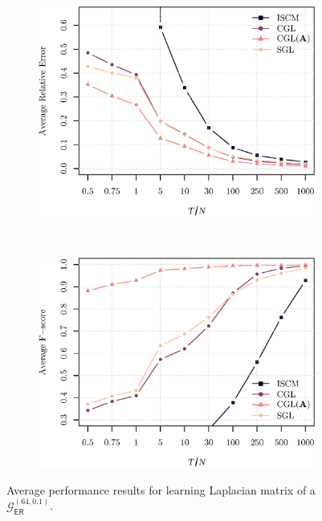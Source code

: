 \begin{figure}[!htb]
    \centering
    \begin{subfigure}[b]{0.47\textwidth}
        \includegraphics[width=\textwidth]{erdos-renyi/relative_error_erdos_renyi.eps}
    \end{subfigure}
    ~ %
    \begin{subfigure}[b]{0.47\textwidth}
        \includegraphics[width=\textwidth]{erdos-renyi/fscore_erdos_renyi.eps}
    \end{subfigure}
    \caption{Average performance results for learning Laplacian matrix of a $\mathcal{G}^{(64, 0.1)}_{\mathsf{ER}}$.}
    \label{fig:performance-erdos-renyi}
\end{figure}

